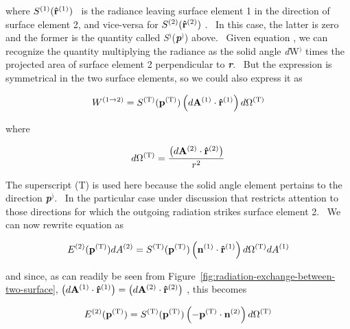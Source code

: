 where \({S^{{\rm{(1)}}}}({{\bf{\hat r}}^{{\rm{(1)}}}})\) ~is the radiance leaving surface element 1 in the direction of surface element 2, and vice-versa for \({S^{{\rm{(2)}}}}({{\bf{\hat r}}^{{\rm{(2)}}}})\) .~ In this case, the latter is zero and the former is the quantity called \emph{S}\(^{)}\)(\textbf{\emph{p}}\(^{)}\)) above.~ Given equation , we can recognize the quantity multiplying the radiance as the solid angle \emph{d}W\(^{)}\) times the projected area of surface element 2 perpendicular to \textbf{\emph{r}}.~ But the expression is symmetrical in the two surface elements, so we could also express it as

\begin{equation}
{W^{(1 \to 2)}} = {S^{{\rm{(T)}}}}({{\bf{p}}^{{\rm{(T)}}}})\left( {d{{\bf{A}}^{{\rm{(1)}}}} \cdot {{{\bf{\hat r}}}^{{\rm{(1)}}}}} \right)d{\Omega ^{{\rm{(T)}}}}
\end{equation}

where

\begin{equation}
d{\Omega ^{{\rm{(T)}}}} = \frac{{\left( {d{{\bf{A}}^{{\rm{(2)}}}} \cdot {{{\bf{\hat r}}}^{{\rm{(2)}}}}} \right)}}{{{r^2}}}
\end{equation}

The superscript (T) is used here because the solid angle element pertains to the direction \textbf{\emph{p}}\(^{)}\).~ In the particular case under discussion that restricts attention to those directions for which the outgoing radiation strikes surface element 2.~ We can now rewrite equation as

\begin{equation}
{E^{{\rm{(2)}}}}({{\bf{p}}^{{\rm{(T)}}}})d{A^{{\rm{(2)}}}} = {S^{{\rm{(T)}}}}({{\bf{p}}^{{\rm{(T)}}}})\left( {{{\bf{n}}^{{\rm{(1)}}}} \cdot {{{\bf{\hat r}}}^{{\rm{(1)}}}}} \right)d{\Omega ^{{\rm{(T)}}}}d{A^{{\rm{(1)}}}}
\end{equation}

and since, as can readily be seen from Figure~\ref{fig:radiation-exchange-between-two-surface}, \(\left( {d{{\bf{A}}^{{\rm{(1)}}}} \cdot {{{\bf{\hat r}}}^{{\rm{(1)}}}}} \right) = \left( {d{{\bf{A}}^{{\rm{(2)}}}} \cdot {{{\bf{\hat r}}}^{{\rm{(2)}}}}} \right)\) , this becomes

\begin{equation}
{E^{{\rm{(2)}}}}({{\bf{p}}^{{\rm{(T)}}}}) = {S^{{\rm{(T)}}}}({{\bf{p}}^{{\rm{(T)}}}})\left( { - {{\bf{p}}^{{\rm{(T)}}}} \cdot {{\bf{n}}^{{\rm{(2)}}}}} \right)d{\Omega ^{{\rm{(T)}}}}
\end{equation}

